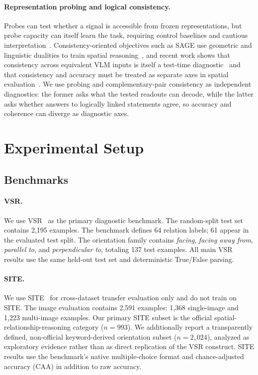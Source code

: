 \documentclass[10pt,twocolumn,letterpaper]{article}
\begin{document}
\paragraph{Representation probing and logical consistency.}
Probes can test whether a signal is accessible from frozen representations, but probe capacity can itself learn the task, requiring control baselines and cautious interpretation~\cite{hewitt2019probes}. Consistency-oriented objectives such as SAGE use geometric and linguistic dualities to train spatial reasoning~\cite{liu2026sage}, and recent work shows that consistency across equivalent VLM inputs is itself a test-time diagnostic~\cite{testsime2026consistency} and that consistency and accuracy must be treated as separate axes in spatial evaluation~\cite{consistent2026yetwrong}. We use probing and complementary-pair consistency as independent diagnostics: the former asks what the tested readouts can decode, while the latter asks whether answers to logically linked statements agree, so accuracy and coherence can diverge as diagnostic axes.

\section{Experimental Setup}
\label{sec:setup}
\subsection{Benchmarks}
\paragraph{VSR.}
We use VSR~\cite{liu2023vsr} as the primary diagnostic benchmark. The random-split test set contains 2,195 examples. The benchmark defines 64 relation labels; 61 appear in the evaluated test split. The orientation family contains \emph{facing}, \emph{facing away from}, \emph{parallel to}, and \emph{perpendicular to}, totaling 137 test examples. All main VSR results use the same held-out test set and deterministic True/False parsing.

\paragraph{SITE.}
We use SITE~\cite{wang2025site} for cross-dataset transfer evaluation only and do not train on SITE. The image evaluation contains 2,591 examples: 1,368 single-image and 1,223 multi-image examples. Our primary SITE subset is the official spatial-relationship-reasoning category ($n=993$). We additionally report a transparently defined, non-official keyword-derived orientation subset ($n=2{,}024$), analyzed as exploratory evidence rather than as direct replication of the VSR construct. SITE results use the benchmark's native multiple-choice format and chance-adjusted accuracy (CAA) in addition to raw accuracy.
\end{document}
